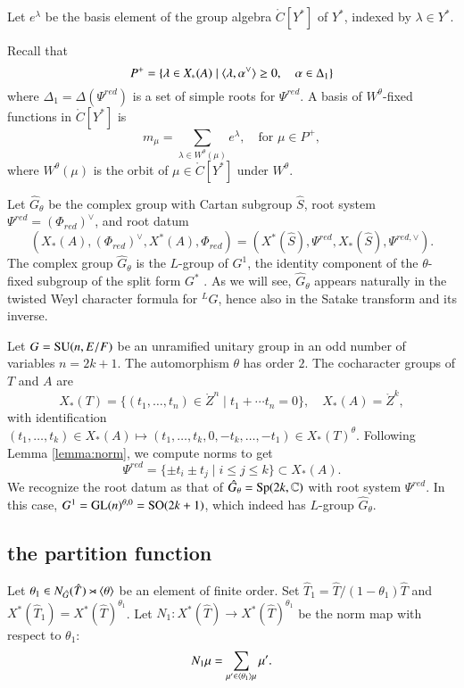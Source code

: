 Let $e^\lambda$ be the basis element of the group algebra
$\ring{C}[Y^*]$ of $Y^*$, indexed by $\lambda\in Y^*$.

Recall that
\[
P^+ = \{\lambda\in X_*(A) \mid \langle{\lambda,\alpha^\vee}\rangle\ge 0,
\quad \alpha\in \Delta_1\}
\]
where $\Delta_1=\Delta(\Psi^{red})$ is a set of simple roots for
$\Psi^{red}$.  A basis of $W^\theta$-fixed functions in
$\ring{C}[Y^*]$ is
\begin{equation}\label{eqn:mmu}
m_\mu = \sum_{\lambda\in W^\theta(\mu)} e^\lambda, 
\quad \text{for }\mu\in P^+,
\end{equation}
where $W^\theta(\mu)$ is the orbit of $\mu\in\ring{C}[Y^*]$ under
$W^\theta$.

Let $\hat G_\theta$ be the complex group with Cartan subgroup $\hat
S$, root system $\Psi^{red}=(\Phi_{red})^\vee$, and root datum
\[
(X_*(A),(\Phi_{red})^\vee,X^*(A),\Phi_{red}) 
= (X^*(\hat S),\Psi^{red},X_*(\hat S),\Psi^{red,\vee}).
\]
The complex group $\hat G_\theta$ is the $L$-group of $G^1$, the
identity component of the $\theta$-fixed subgroup of the split form
$G^*$ \cite[\S1.3]{kottwitz1999foundations}.  As we will see, $\hat
G_\theta$ appears naturally in the twisted Weyl character formula for
${}^LG$, hence also in the Satake transform and its inverse.

\begin{example} Let $G={\operatorname{SU}}(n,E/F)$ be an unramified unitary group
  in an odd number of variables $n=2k+1$.  The automorphism $\theta$
  has order $2$.  The cocharacter groups of $T$ and $A$ are
\[
X_*(T) = \{(t_1,\ldots,t_{n})\in \ring{Z}^n\mid t_1+\cdots t_n=0\}, 
\quad
X_*(A)  = \ring{Z}^k,
\]
with identification $(t_1,\ldots,t_k)\in X_*(A)\mapsto
(t_1,\ldots,t_k,0,-t_k,\ldots,-t_1)\in X_*(T)^\theta$.  Following
Lemma \ref{lemma:norm}, we compute norms to get
\[
\Psi^{red} = \{\pm t_i\pm t_j\mid i\le j\le k\}\subset X_*(A).
\]
We recognize the root datum as that of $\hat G_\theta =
{\operatorname{Sp}}(2k,\mathbb{C})$ with root system $\Psi^{red}$.  In this case, $G^1
= {\operatorname{GL}}(n)^{\theta,0} = {\operatorname{SO}}(2k+1)$, which indeed has $L$-group
$\hat G_\theta$.
\end{example}


\subsection{the partition function}

Let $\theta_1\in N_{\hat G}(\hat T) \rtimes \langle{\theta}\rangle$ be an
element of finite order.  Set $\hat T_1 = \hat T/(1-\theta_1)\hat T$
and $X^*(\hat T_1) = X^*(\hat T)^{\theta_1}$.  Let $N_1:X^*(\hat T)\to
X^*(\hat T)^{\theta_1}$ be the norm map with respect to $\theta_1$:
\[
N_1 \mu = \sum_{\mu'\in \langle{\theta_1}\rangle\mu} \mu'.
\]

